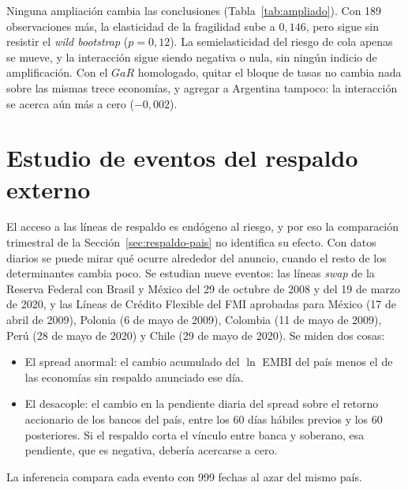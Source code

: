 Ninguna ampliación cambia las conclusiones (Tabla~\ref{tab:ampliado}). Con 189 observaciones más, la elasticidad de la fragilidad sube a $0{,}146$, pero sigue sin resistir el \textit{wild bootstrap} ($p=0{,}12$). La semielasticidad del riesgo de cola apenas se mueve, y la interacción sigue siendo negativa o nula, sin ningún indicio de amplificación. Con el $GaR$ homologado, quitar el bloque de tasas no cambia nada sobre las mismas trece economías, y agregar a Argentina tampoco: la interacción se acerca aún más a cero ($-0{,}002$).

\section{Estudio de eventos del respaldo externo}
\label{sec:eventos}

El acceso a las líneas de respaldo es endógeno al riesgo, y por eso la comparación trimestral de la Sección~\ref{sec:respaldo-pais} no identifica su efecto. Con datos diarios se puede mirar qué ocurre alrededor del anuncio, cuando el resto de los determinantes cambia poco. Se estudian nueve eventos: las líneas \textit{swap} de la Reserva Federal con Brasil y México del 29 de octubre de 2008 y del 19 de marzo de 2020, y las Líneas de Crédito Flexible del FMI aprobadas para México (17 de abril de 2009), Polonia (6 de mayo de 2009), Colombia (11 de mayo de 2009), Perú (28 de mayo de 2020) y Chile (29 de mayo de 2020). Se miden dos cosas:
\begin{itemize}
    \item El spread anormal: el cambio acumulado del $\ln$ EMBI del país menos el de las economías sin respaldo anunciado ese día.
    \item El desacople: el cambio en la pendiente diaria del spread sobre el retorno accionario de los bancos del país, entre los 60 días hábiles previos y los 60 posteriores. Si el respaldo corta el vínculo entre banca y soberano, esa pendiente, que es negativa, debería acercarse a cero.
\end{itemize}
La inferencia compara cada evento con 999 fechas al azar del mismo país.

